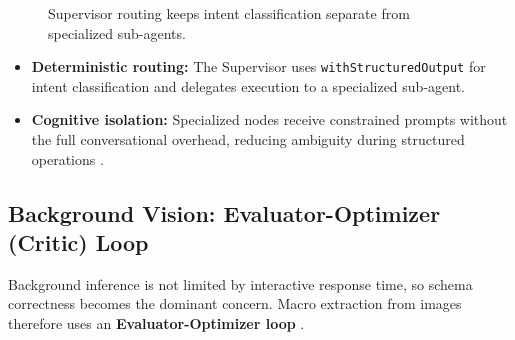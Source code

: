 \documentclass[11pt,a4paper,twoside]{article}
\begin{document}
\begin{figure}[H]
\caption{Supervisor routing keeps intent classification separate from specialized sub-agents.}
\end{figure}
\FloatBarrier

\begin{itemize}
  \item \textbf{Deterministic routing:} The Supervisor uses \texttt{withStructuredOutput} for intent classification and delegates execution to a specialized sub-agent.
  \item \textbf{Cognitive isolation:} Specialized nodes receive constrained prompts without the full conversational overhead, reducing ambiguity during structured operations \cite{wu2023autogen}.
\end{itemize}

\subsection{Background Vision: Evaluator-Optimizer (Critic) Loop}

Background inference is not limited by interactive response time, so schema correctness becomes the dominant concern. Macro extraction from images therefore uses an \textbf{Evaluator-Optimizer loop} \cite{shinn2023reflexion}.
\end{document}
